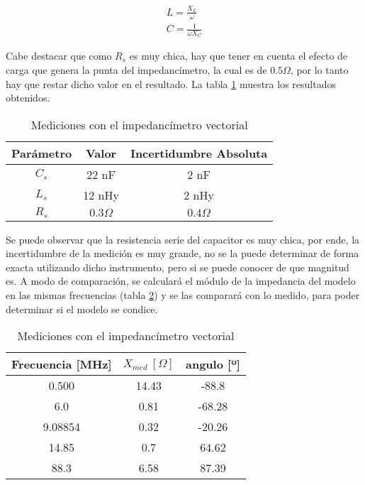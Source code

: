 \documentclass[a4paper,10pt]{article}
\begin{document}
		\begin{align}\label{unaEcuacion}
			L = \frac{X_L}{\omega} \nonumber \\
			C = \frac{1}{\omega X_C} 
		\end{align}

		\indent Cabe destacar que como $R_s$ es muy chica, hay que tener en 
		cuenta el efecto de carga que genera la punta del impedancímetro, la 
		cual es de $0.5 \Omega$, por lo tanto hay que restar dicho valor en el
		resultado. La tabla \ref{otraTab} muestra los resultados obtenidos.
		
		\begin{table}[!htp]
			\centering
			\begin{tabular}{|c|c|c|}
				\hline
				Parámetro & Valor & Incertidumbre Absoluta \\ 
				\hline
				$C_s$ & 22 nF & 2 nF \\
				\hline
				$L_s$ & 12 nHy & 2 nHy \\
				\hline
				$R_s$ & $0.3 \Omega$ & $0.4 \Omega$ \\ 
				\hline
			\end{tabular}
			\caption{Mediciones con el impedancímetro vectorial} \label{otraTab}
		\end{table}

		\indent Se puede observar que la resistencia serie del capacitor es 
		muy chica, por ende, la incertidumbre de la medición es muy grande, no 
		se la puede determinar de forma exacta utilizando dicho instrumento, 
		pero si se puede conocer de que magnitud es. 
		\indent A modo de comparación, se calculará el módulo de la impedancia 
		del modelo en las mismas frecuencias (tabla \ref{tab:009}) y se las 
		comparará con lo medido, para poder determinar si el modelo se condice.

		\begin{table}[!htp]
			\centering
			\begin{tabular}{|c|c|c|}
				\hline
				Frecuencia [MHz] & $X_{med}~[\Omega] $ & angulo [º] \\
				\hline
				0.500 & 14.43 & -88.8 \\
				\hline
				6.0 & 0.81 & -68.28 \\
				\hline
				9.08854 & 0.32 & -20.26 \\ 
				\hline
				14.85 & 0.7 & 64.62 \\
				\hline
				88.3 & 6.58 & 87.39 \\ 
				\hline			
			\end{tabular}
			\caption{Mediciones con el impedancímetro vectorial} \label{tab:009}
		\end{table}
\end{document}
